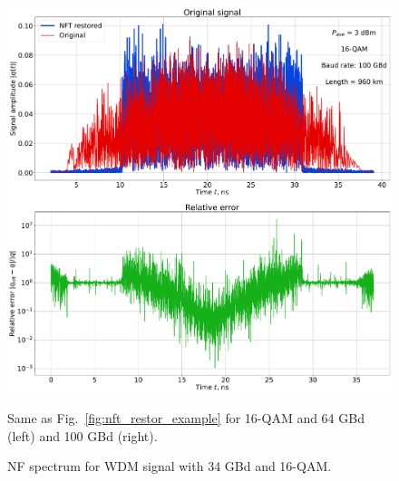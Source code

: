 \begin{landscape}
\begin{figure}[htpb]
\begin{minipage}[h]{0.5\linewidth}
{        \includegraphics[width=1\linewidth]{images/window/nft_restoration_and_relative_error_16qam_100gbd_12spans_80km.pdf} \\
    }
    \end{minipage}
    \caption{Same as Fig.~\ref{fig:nft_restor_example} for 16-QAM and 64 GBd (left) and 100 GBd (right).}
    \label{fig:nft_compare_baud}
\end{figure}
\end{landscape}

\begin{landscape}
    \begin{figure}[htpb]
    \caption{NF spectrum for WDM signal with 34 GBd and 16-QAM.}
    \label{fig:nft_34gbd_16qam}
\end{figure}
\end{landscape}

